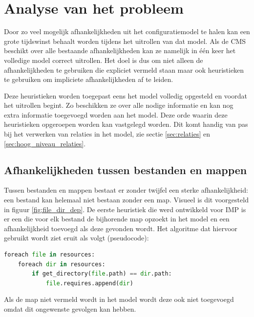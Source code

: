 
\chapter{Analyse van het probleem}
\label{sec:analyse}
Door zo veel mogelijk afhankelijkheden uit het configuratiemodel te halen kan een grote tijdswinst behaalt worden tijdens het uitrollen van dat model.
Als de CMS beschikt over alle bestaande afhankelijkheden kan ze namelijk in \'e\'en keer het volledige model correct uitrollen.
Het doel is dus om niet alleen de afhankelijkheden te gebruiken die expliciet vermeld staan maar ook heuristieken te gebruiken om impliciete afhankelijkheden af te leiden.

Deze heuristieken worden toegepast eens het model volledig opgesteld en voordat het uitrollen begint.
Zo beschikken ze over alle nodige informatie en kan nog extra informatie toegevoegd worden aan het model.
Deze orde waarin deze heuristieken opgeroepen worden kan vastgelegd worden. Dit komt handig van pas bij het verwerken van relaties in het model, zie sectie \ref{sec:relaties} en \ref{sec:hoog_niveau_relaties}.

\section{Afhankelijkheden tussen bestanden en mappen}
\label{sec:bestanden_en_mappen}
Tussen bestanden en mappen bestaat er zonder twijfel een sterke afhankelijkheid: een bestand kan helemaal niet bestaan zonder een map.
Visueel is dit voorgesteld in figuur \ref{fig:file_dir_dep}.
De eerste heuristiek die werd ontwikkeld voor IMP is er een die voor elk bestand de bijhorende map opzoekt in het model en een afhankelijkheid toevoegd als deze gevonden wordt.
Het algoritme dat hiervoor gebruikt wordt ziet eruit als volgt (pseudocode):

\begin{minipage}{\textwidth}
\begin{lstlisting}[language=Python]
foreach file in resources:
    foreach dir in resources:
        if get_directory(file.path) == dir.path:
            file.requires.append(dir)
\end{lstlisting}
\end{minipage}

Als de map niet vermeld wordt in het model wordt deze ook niet toegevoegd omdat dit ongewenste gevolgen kan hebben. 

